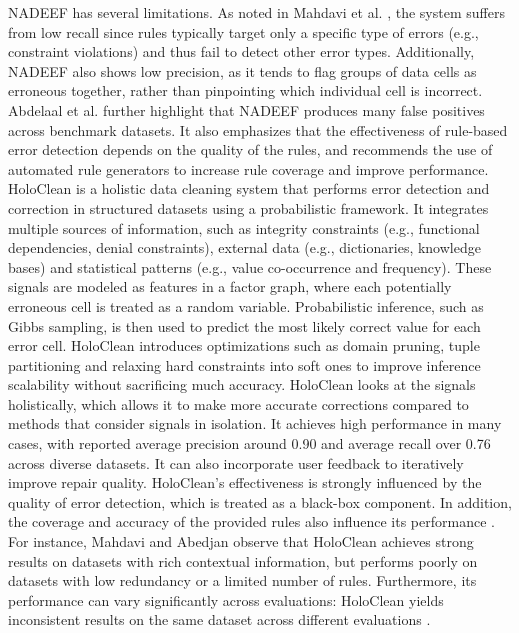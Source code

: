 NADEEF has several limitations. 
As noted in Mahdavi et al. \cite{RAHA}, the system suffers from low recall since rules typically target only a specific type of errors (e.g., constraint violations) and thus fail to detect other error types. 
Additionally, NADEEF also shows low precision, as it tends to flag groups of data cells as erroneous together, rather than pinpointing which individual cell is incorrect. 
Abdelaal et al. \cite{REIN} further highlight that NADEEF produces many false positives across benchmark datasets. 
It also emphasizes that the effectiveness of rule-based error detection depends on the quality of the rules, and recommends the use of automated rule generators to increase rule coverage and improve performance.
\newline\newline
HoloClean \cite{HOLOCLEAN} is a holistic data cleaning system that performs error detection and correction in structured datasets using a probabilistic framework. 
It integrates multiple sources of information, such as integrity constraints (e.g., functional dependencies, denial constraints), external data (e.g., dictionaries, knowledge bases) and statistical patterns (e.g., value co-occurrence and frequency). 
These signals are modeled as features in a factor graph, where each potentially erroneous cell is treated as a random variable. 
Probabilistic inference, such as Gibbs sampling, is then used to predict the most likely correct value for each error cell. 
HoloClean introduces optimizations such as domain pruning, tuple partitioning and relaxing hard constraints into soft ones to improve inference scalability without sacrificing much accuracy. 
HoloClean looks at the signals holistically, which allows it to make more accurate corrections compared to methods that consider signals in isolation. 
It achieves high performance in many cases, with reported average precision around 0.90 and average recall over 0.76 across diverse datasets. 
It can also incorporate user feedback to iteratively improve repair quality. 
HoloClean's effectiveness is strongly influenced by the quality of error detection, which is treated as a black-box component. 
In addition, the coverage and accuracy of the provided rules also influence its performance \cite{REIN}. 
For instance, Mahdavi and Abedjan \cite{BARAN} observe that HoloClean achieves strong results on datasets with rich contextual information, but performs poorly on datasets with low redundancy or a limited number of rules. 
Furthermore, its performance can vary significantly across evaluations: HoloClean yields inconsistent results on the same dataset across different evaluations \cite{SAGED, HOLODETECT}.
